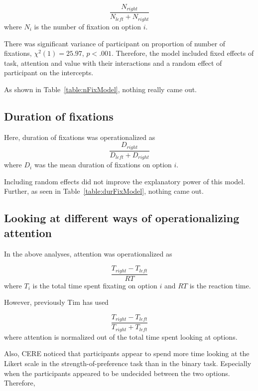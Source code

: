 \documentclass[12pt]{article}
\begin{document}
\begin{equation}
	\frac{N_{right}}{N_{left}+N_{right}}
\end{equation}
where $N_i$ is the number of fixation on option $i$. 

There was significant variance of participant on proportion of number of fixations, $\chi^2(1)=25.97$, $p<.001$. Therefore, the model included fixed effects of task, attention and value with their interactions and a random effect of participant on the intercepts. 



As shown in Table~\ref{table:nFixModel}, nothing really came out. 

\subsection{Duration of fixations}
Here, duration of fixations was operationalized as 
\begin{equation}
	\frac{D_{right}}{D_{left} + D_{right}}
\end{equation}
where $D_i$ was the mean duration of fixations on option $i$. 

Including random effects did not improve the explanatory power of this model. Further, as seen in Table~\ref{table:durFixModel}, nothing came out. 



\clearpage
\newpage
\subsection{Looking at different ways of operationalizing attention}
In the above analyses, attention was operationalized as 

\begin{equation}
	\frac{T_{right}-T_{left}}{RT}	
\end{equation}
where $T_i$ is the total time spent fixating on option $i$ and $RT$ is the reaction time. 

However, previously Tim has used

\begin{equation}
	\frac{T_{right}-T_{left}}{T_{right}+T_{left}}
\end{equation}
where attention is normalized out of the total time spent looking at options. 

Also, CERE noticed that participants appear to spend more time looking at the Likert scale in the strength-of-preference task than in the binary task. Especially when the participants appeared to be undecided between the two options. Therefore, 
\end{document}
